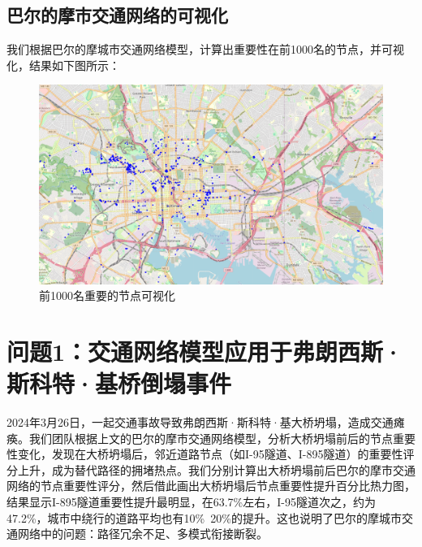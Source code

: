 \documentclass[12pt, a4paper, oneside]{ctexart}
\begin{document}
\subsection{巴尔的摩市交通网络的可视化}

我们根据巴尔的摩城市交通网络模型，计算出重要性在前1000名的节点，并可视化，结果如下图所示：

\begin{figure}[H]
  \centering
  \includegraphics[width=\textwidth]{figures/vis.png}
  \caption{前1000名重要的节点可视化}
  \label{fig:vis}
\end{figure}

\section{问题1：交通网络模型应用于弗朗西斯·斯科特·基桥倒塌事件}

2024年3月26日，一起交通事故导致弗朗西斯·斯科特·基大桥坍塌，造成交通瘫痪。我们团队根据上文的巴尔的摩市交通网络模型，分析大桥坍塌前后的节点重要性变化，发现在大桥坍塌后，邻近道路节点（如I-95隧道、I-895隧道）的重要性评分上升，成为替代路径的拥堵热点。我们分别计算出大桥坍塌前后巴尔的摩市交通网络的节点重要性评分，然后借此画出大桥坍塌后节点重要性提升百分比热力图，结果显示I-895隧道重要性提升最明显，在63.7\%左右，I-95隧道次之，约为47.2\%，城市中绕行的道路平均也有10\%~20\%的提升。这也说明了巴尔的摩城市交通网络中的问题：路径冗余不足、多模式衔接断裂。
\end{document}
